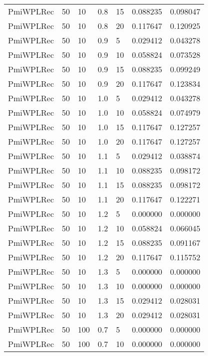 \begin{tabular}{lllrlrr}
 PmiWPLRec &   50 &    10 &   0.8 &   15 &     0.088235 &  0.098047 \\
 PmiWPLRec &   50 &    10 &   0.8 &   20 &     0.117647 &  0.120925 \\
 PmiWPLRec &   50 &    10 &   0.9 &    5 &     0.029412 &  0.043278 \\
 PmiWPLRec &   50 &    10 &   0.9 &   10 &     0.058824 &  0.073528 \\
 PmiWPLRec &   50 &    10 &   0.9 &   15 &     0.088235 &  0.099249 \\
 PmiWPLRec &   50 &    10 &   0.9 &   20 &     0.117647 &  0.123834 \\
 PmiWPLRec &   50 &    10 &   1.0 &    5 &     0.029412 &  0.043278 \\
 PmiWPLRec &   50 &    10 &   1.0 &   10 &     0.058824 &  0.074979 \\
 PmiWPLRec &   50 &    10 &   1.0 &   15 &     0.117647 &  0.127257 \\
 PmiWPLRec &   50 &    10 &   1.0 &   20 &     0.117647 &  0.127257 \\
 PmiWPLRec &   50 &    10 &   1.1 &    5 &     0.029412 &  0.038874 \\
 PmiWPLRec &   50 &    10 &   1.1 &   10 &     0.088235 &  0.098172 \\
 PmiWPLRec &   50 &    10 &   1.1 &   15 &     0.088235 &  0.098172 \\
 PmiWPLRec &   50 &    10 &   1.1 &   20 &     0.117647 &  0.122271 \\
 PmiWPLRec &   50 &    10 &   1.2 &    5 &     0.000000 &  0.000000 \\
 PmiWPLRec &   50 &    10 &   1.2 &   10 &     0.058824 &  0.066045 \\
 PmiWPLRec &   50 &    10 &   1.2 &   15 &     0.088235 &  0.091167 \\
 PmiWPLRec &   50 &    10 &   1.2 &   20 &     0.117647 &  0.115752 \\
 PmiWPLRec &   50 &    10 &   1.3 &    5 &     0.000000 &  0.000000 \\
 PmiWPLRec &   50 &    10 &   1.3 &   10 &     0.000000 &  0.000000 \\
 PmiWPLRec &   50 &    10 &   1.3 &   15 &     0.029412 &  0.028031 \\
 PmiWPLRec &   50 &    10 &   1.3 &   20 &     0.029412 &  0.028031 \\
 PmiWPLRec &   50 &   100 &   0.7 &    5 &     0.000000 &  0.000000 \\
 PmiWPLRec &   50 &   100 &   0.7 &   10 &     0.000000 &  0.000000 \\

\end{tabular}
